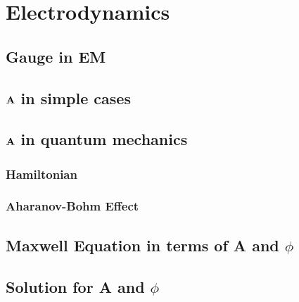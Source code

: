 \documentclass[12pt,a4paper]{article}
\begin{document}
\section{Electrodynamics}
\subsection{Gauge in EM}
\subsection{$\vb{A}$ in simple cases}
\subsection{$\vb{A}$ in quantum mechanics}
\subsubsection{Hamiltonian}
\subsubsection{Aharanov-Bohm Effect}
\subsection {Maxwell Equation in terms of A and $\phi$}
\subsection {Solution for A and $\phi$}


    
    
\end{document}
